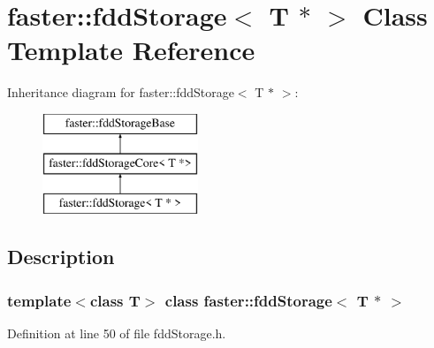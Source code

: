 \hypertarget{classfaster_1_1fddStorage_3_01T_01_5_01_4}{}\section{faster\+:\+:fdd\+Storage$<$ T $\ast$ $>$ Class Template Reference}
\label{classfaster_1_1fddStorage_3_01T_01_5_01_4}
Inheritance diagram for faster\+:\+:fdd\+Storage$<$ T $\ast$ $>$\+:\begin{figure}[H]
\begin{center}
\leavevmode
\includegraphics[height=3.000000cm]{classfaster_1_1fddStorage_3_01T_01_5_01_4}
\end{center}
\end{figure}


\subsection{Description}
\subsubsection*{template$<$class T$>$\newline
class faster\+::fdd\+Storage$<$ T $\ast$ $>$}



Definition at line 50 of file fdd\+Storage.\+h.

